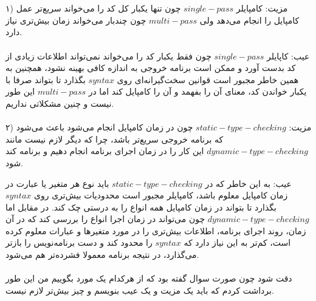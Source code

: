 \\
\\
۱)
 مزیت: کامپایلر $single-pass$ چون تنها یکبار کل کد را می‌خواند سریع‌تر عمل کامپایل را انجام می‌دهد ولی $multi-pass$ چون چندبار می‌خواند زمان بیش‌تری نیاز دارد.
\\
\\
عیب: کاپایلر $single-pass$ چون فقط یکبار کد را می‌خواند نمی‌تواند اطلاعات زیادی از کد بدست آورد و ممکن است برنامه خروجی به اندازه کافی بهینه نشود، همچنین به همین خاطر مجبور است قوانین سخت‌گیرانه‌ای روی $syntax$ بگذارد تا بتواند صرفا با یکبار خواندن کد، معنای آن را بفهمد و آن را کامپایل کند اما در $multi-pass$ این طور نیست و چنین مشکلاتی نداریم.
\\
\\
۲)
مزیت: $static-type-checking$ چون در زمان کامپایل انجام می‌شود باعث می‌شود که برنامه خروجی سریع‌تر باشد، چرا که دیگر لازم نیست مانند $dynamic-type-checking$ این کار را در زمان اجرای برنامه انجام دهیم و برنامه کند شود.

عیب: به این خاطر که در $static-type-checking$ باید نوع هر متغیر یا عبارت در زمان کامپایل معلوم باشد، کامپایلر مجبور است محدودیات بیش‌تری روی $syntax$ بگذارد تا بتواند در زمان کامپایل همه انواع را به درستی چک کند. در مقابل اما $dynamic-type-checking$ چون می‌تواند در زمان اجرا انواع را بررسی کند که در آن زمان، روند اجرای برنامه، اطلاعات بیش‌تری را در مورد متغیرها و عبارات معلوم کرده است، کم‌تر به این نیاز دارد که $syntax$ را محدود کند و دست برنامه‌نویس را بازتر می‌گذارد، در نتیجه برنامه معمولا فشرده‌تر هم می‌شود.
\\
\\
دقت شود چون صورت سوال گفته بود که از هرکدام یک مورد بگوییم من این طور برداشت کردم که باید یک مزیت و یک عیب بنویسم و چیز بیش‌تر لازم نیست.
\\